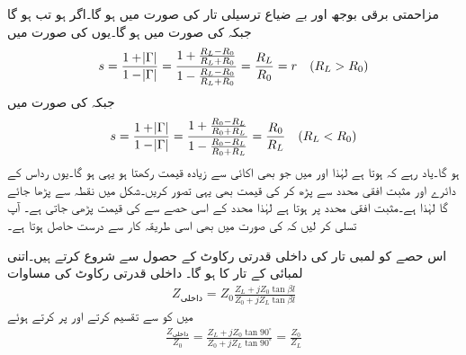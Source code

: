 مزاحمتی برقی بوجھ  اور بے ضیاع ترسیلی تار کی صورت میں  ہو گا۔اگر  ہو تب 
 ہو گا جبکہ   کی صورت میں  ہو گا۔یوں  کی صورت میں
\begin{align*}
s=\frac{1+\abs{\Gamma}}{1-\abs{\Gamma}}=\frac{1+\frac{R_L-R_0}{R_L+R_0}}{1-\frac{R_L-R_0}{R_L+R_0}}=\frac{R_L}{R_0}=r \quad{(R_L>R_0)}
\end{align*}
جبکہ  کی صورت میں
\begin{align*}
s=\frac{1+\abs{\Gamma}}{1-\abs{\Gamma}}=\frac{1+\frac{R_0-R_L}{R_0+R_L}}{1-\frac{R_0-R_L}{R_0+R_L}}=\frac{R_0}{R_L} \quad{(R_L<R_0)}
\end{align*}
ہو گا۔یاد رہے کہ  ہوتا ہے لہٰذا  اور  میں جو بھی اکائی سے زیادہ قیمت رکھتا ہو یہی  ہو گا۔یوں  رداس کے دائرے اور مثبت افقی محدد سے  پڑھ کر  کی قیمت بھی یہی تصور کریں۔شکل  میں نقطہ  سے  پڑھا جائے گا لہٰذا  ہے۔مثبت افقی محدد پر  ہوتا ہے لہٰذا محدد کے اسی حصے سے  کی قیمت پڑھی جاتی ہے۔ آپ تسلی کر لیں کہ  کی صورت میں بھی اسی طریقہ کار سے درست  حاصل ہوتا ہے۔

اس حصے کو  لمبی تار کی داخلی قدرتی رکاوٹ کے حصول سے شروع کرتے ہیں۔اتنی لمبائی کے تار کا  ہو گا۔ داخلی قدرتی رکاوٹ کی مساوات
\begin{align*}
Z_{\text{داخلی}}=Z_{0} \frac{Z_{L}+j Z_{0}\tan \beta l}{Z_{0}+j Z_{L}\tan \beta l}
\end{align*}
میں  کو  سے تقسیم کرتے اور   پر کرتے ہوئے
\begin{align*}
\frac{Z_{\text{داخلی}}}{Z_{0}}= \frac{Z_{L}+j Z_{0}\tan 90^\circ}{Z_{0}+j Z_{L}\tan 90^\circ}=\frac{Z_0}{Z_L}
\end{align*}

